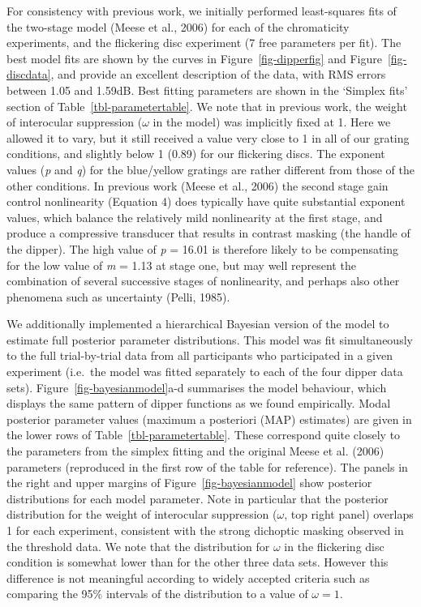 \documentclass[
  letterpaper,
  DIV=11,
  numbers=noendperiod]{scrartcl}
\begin{document}
For consistency with previous work, we initially performed least-squares
fits of the two-stage model (Meese et al., 2006) for each of the
chromaticity experiments, and the flickering disc experiment (7 free
parameters per fit). The best model fits are shown by the curves in
Figure~\ref{fig-dipperfig} and Figure~\ref{fig-discdata}, and provide an
excellent description of the data, with RMS errors between 1.05 and
1.59dB. Best fitting parameters are shown in the `Simplex fits' section
of Table~\ref{tbl-parametertable}. We note that in previous work, the
weight of interocular suppression (\(\omega\) in the model) was
implicitly fixed at 1. Here we allowed it to vary, but it still received
a value very close to 1 in all of our grating conditions, and slightly
below 1 (0.89) for our flickering discs. The exponent values (\emph{p}
and \emph{q}) for the blue/yellow gratings are rather different from
those of the other conditions. In previous work (Meese et al., 2006) the
second stage gain control nonlinearity (Equation 4) does typically have
quite substantial exponent values, which balance the relatively mild
nonlinearity at the first stage, and produce a compressive transducer
that results in contrast masking (the handle of the dipper). The high
value of \emph{p} = 16.01 is therefore likely to be compensating for the
low value of \emph{m} = 1.13 at stage one, but may well represent the
combination of several successive stages of nonlinearity, and perhaps
also other phenomena such as uncertainty (Pelli, 1985).

We additionally implemented a hierarchical Bayesian version of the model
to estimate full posterior parameter distributions. This model was fit
simultaneously to the full trial-by-trial data from all participants who
participated in a given experiment (i.e.~the model was fitted separately
to each of the four dipper data sets). Figure~\ref{fig-bayesianmodel}a-d
summarises the model behaviour, which displays the same pattern of
dipper functions as we found empirically. Modal posterior parameter
values (maximum a posteriori (MAP) estimates) are given in the lower
rows of Table~\ref{tbl-parametertable}. These correspond quite closely
to the parameters from the simplex fitting and the original Meese et al.
(2006) parameters (reproduced in the first row of the table for
reference). The panels in the right and upper margins of
Figure~\ref{fig-bayesianmodel} show posterior distributions for each
model parameter. Note in particular that the posterior distribution for
the weight of interocular suppression (\(\omega\), top right panel)
overlaps 1 for each experiment, consistent with the strong dichoptic
masking observed in the threshold data. We note that the distribution
for \(\omega\) in the flickering disc condition is somewhat lower than
for the other three data sets. However this difference is not meaningful
according to widely accepted criteria such as comparing the 95\%
intervals of the distribution to a value of \(\omega=1\).
\end{document}
